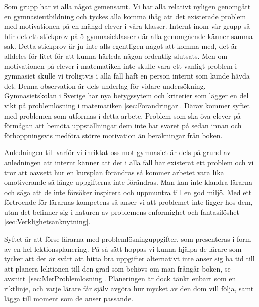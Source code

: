 \textcolor{WildStrawberry}{
    Som grupp har vi alla något gemensamt. Vi har alla relativt nyligen genomgått en gymnasieutbildning och tyckes alla komma ihåg att det existerade problem med motivationen på en mängd elever i våra klasser. Internt inom vår grupp så blir det ett stickprov på 5 gymnasieklasser där alla genomgående känner samma sak. Detta stickprov är ju inte alls egentligen något att komma med, det är alldeles för litet för att kunna härleda någon ordentlig slutsats. Men om motivationen på elever i matematiken inte skulle vara ett vanligt problem i gymnasiet skulle vi troligtvis i alla fall haft en person internt som kunde hävda det. Denna observation är dels underlag för vidare undersökning. Gymnasietskolan i Sverige har nya betygssytem och kriterier som lägger en del vikt på problemlösning i matematiken \ref{sec:Forandringar}. Därav kommer syftet med problemen som utformas i detta arbete. Problem som ska öva elever på förmågan att bemöta uppställningar dem inte har svaret på sedan innan och förhoppningsvis medföra större motivation än beräkningar från boken.
}

\textcolor{WildStrawberry}{
    Anledningen till varför vi inriktat oss mot gymnasiet är dels på grund av anledningen att internt känner att det i alla fall har existerat ett problem och vi tror att oavsett hur en kursplan förändras så kommer arbetet vara lika omotiverande så länge uppgifterna inte förändras. Man kan inte klandra lärarna och säga att de inte försöker inspirera och uppmuntra till en god miljö. Med ett förtroende för lärarnas kompetens så anser vi att problemet inte ligger hos dem, utan det befinner sig i naturen av problemens enformighet och fantasilöshet \ref{sec:Verklighetsanknytning}. 
}

\textcolor{lila}{Syftet är att förse lärarna med problemlösninguppgifter, som presenteras i form av en hel lektionsplanering. På så sätt hoppas vi kunna hjälpa de lärare som tycker att det är svårt att hitta bra uppgifter alternativt inte anser sig ha tid till att planera lektionen till den grad som behövs om man frångår boken, se avsnitt~\ref{sec:MerProblemlosning}. Planeringen är dock tänkt enbart som en riktlinje, och varje lärare får själv avgöra hur mycket av den dom vill följa, samt lägga till moment som de anser passande.}